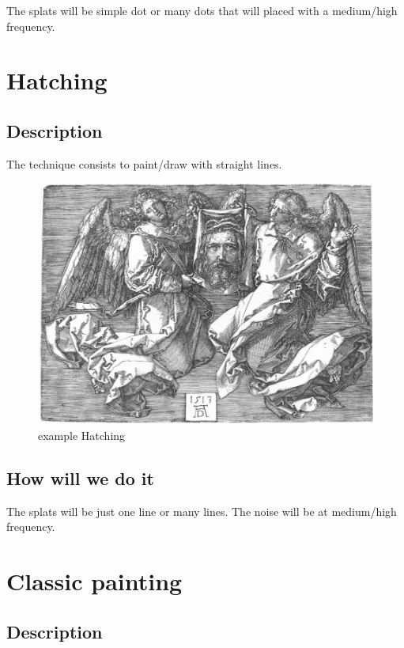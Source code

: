 \documentclass[12pt]{article}
\begin{document}
The splats will be simple dot or many dots that will placed with a medium/high frequency.

\section{Hatching}

\subsection*{Description}

The technique consists to paint/draw with straight lines.

\begin{figure}[!ht]
    \begin{center}
        \includegraphics[scale=0.6]{image/hatching.jpg}
        \caption{example Hatching}
    \end{center}
\end{figure}

\subsection*{How will we do it}

The splats will be just one line or many lines. The noise will be at medium/high frequency.

\section{Classic painting}

\subsection*{Description}
\end{document}
